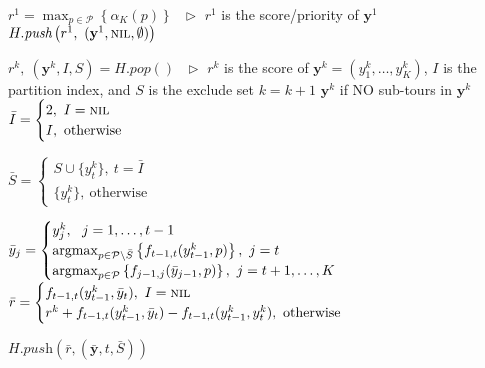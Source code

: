 \begin{algorithm}[htbp]
\begin{algorithmic}[1]
\STATE $r^1 = \max_{p \in \mathcal{P}} \left\{ \alpha_{K}(p) \right\}~~~ \triangleright$ $r^1$ is the score/priority of $\mathbf{y}^1$
\STATE $H.\textit{push}\left(r^1,~ (\mathbf{y}^1, \textsc{nil}, \emptyset) \right)$

    \STATE $r^k,~ (\mathbf{y}^k, I, S) = H.\textit{pop}()~~~ \triangleright$ 
           $r^k$ is the score of $\mathbf{y}^k=(y_1^k,\dots,y_K^k)$, $I$ is the partition index, and $S$ is the exclude set
    \STATE $k = k + 1$
    \RETURN $\mathbf{y}^k$ if NO sub-tours in $\mathbf{y}^k$
    \STATE $\bar{I} = \begin{cases}
                      2,~ I = \textsc{nil} \\
                      I,~ \text{otherwise}
                      \end{cases}$

        \STATE $\bar{S} = \begin{cases}
                          S \cup \{ y_t^k \},~ t = \bar{I} \\
                          \{ y_t^k \},~ \text{otherwise}
                          \end{cases}$

        \STATE $\bar{y}_j = \begin{cases}
                            y_j^k,~~ j=1,\dots,t-1 \\
                            \operatorname*{argmax}_{p \in \mathcal{P} \setminus \bar{S}} \left\{ f_{t-1,t}(y_{t-1}^k, p) \right\},~ j=t \\
                            \operatorname*{argmax}_{p \in \mathcal{P}} \left\{ f_{j-1, j}(\bar{y}_{j-1}, p) \right\},~ j=t+1,\dots,K
                \end{cases}$
        \STATE $\bar{r} = \begin{cases}
                          f_{t-1,t}(y_{t-1}^k, \bar{y}_t),~ I = \textsc{nil} \\
                          r^k + f_{t-1,t}(y_{t-1}^k, \bar{y}_t) - f_{t-1,t}(y_{t-1}^k, y_t^k),~ \text{otherwise}
                          \end{cases}$

        $H.\textit{push}\left(\bar{r}, (\bar{\mathbf{y}}, t, \bar{S}) \right)$
    \ENDFOR
\ENDWHILE
\end{algorithmic}
\end{algorithm}




